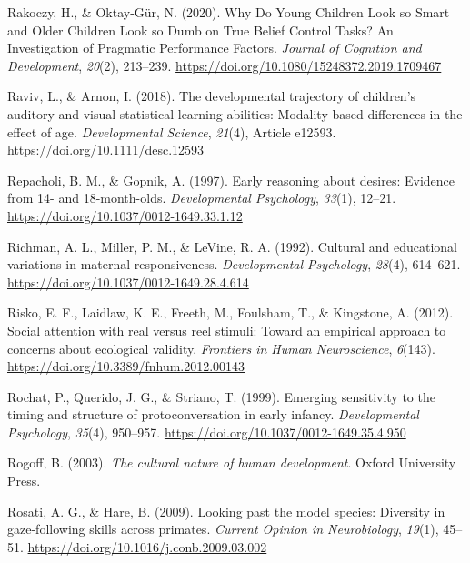 \documentclass[
]{scrbook}
\newlength{\cslhangindent}
\newenvironment{CSLReferences}[2] %
 {\begin{list}{}{%
  \setlength{\itemindent}{0pt}
  \setlength{\leftmargin}{0pt}
  \setlength{\parsep}{0pt}
  \ifodd #1
   \setlength{\leftmargin}{\cslhangindent}
   \setlength{\itemindent}{-1\cslhangindent}
  \fi
  \setlength{\itemsep}{#2\baselineskip}}}
 {\end{list}}
\begin{document}
\begin{CSLReferences}{1}{0}
Rakoczy, H., \& Oktay-Gür, N. (2020). Why {Do Young Children Look} so {Smart} and {Older Children Look} so {Dumb} on {True Belief Control Tasks}? {An Investigation} of {Pragmatic Performance Factors}. \emph{Journal of Cognition and Development}, \emph{20}(2), 213--239. \url{https://doi.org/10.1080/15248372.2019.1709467}

Raviv, L., \& Arnon, I. (2018). The developmental trajectory of children's auditory and visual statistical learning abilities: Modality-based differences in the effect of age. \emph{Developmental Science}, \emph{21}(4), Article e12593. \url{https://doi.org/10.1111/desc.12593}

Repacholi, B. M., \& Gopnik, A. (1997). Early reasoning about desires: {Evidence} from 14- and 18-month-olds. \emph{Developmental Psychology}, \emph{33}(1), 12--21. \url{https://doi.org/10.1037/0012-1649.33.1.12}

Richman, A. L., Miller, P. M., \& LeVine, R. A. (1992). Cultural and educational variations in maternal responsiveness. \emph{Developmental Psychology}, \emph{28}(4), 614--621. \url{https://doi.org/10.1037/0012-1649.28.4.614}

Risko, E. F., Laidlaw, K. E., Freeth, M., Foulsham, T., \& Kingstone, A. (2012). Social attention with real versus reel stimuli: Toward an empirical approach to concerns about ecological validity. \emph{Frontiers in Human Neuroscience}, \emph{6}(143). \url{https://doi.org/10.3389/fnhum.2012.00143}

Rochat, P., Querido, J. G., \& Striano, T. (1999). Emerging sensitivity to the timing and structure of protoconversation in early infancy. \emph{Developmental Psychology}, \emph{35}(4), 950--957. \url{https://doi.org/10.1037/0012-1649.35.4.950}

Rogoff, B. (2003). \emph{The cultural nature of human development}. Oxford University Press.

Rosati, A. G., \& Hare, B. (2009). Looking past the model species: Diversity in gaze-following skills across primates. \emph{Current Opinion in Neurobiology}, \emph{19}(1), 45--51. \url{https://doi.org/10.1016/j.conb.2009.03.002}


\end{CSLReferences}
\end{document}
